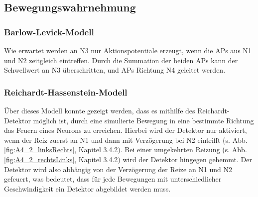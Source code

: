 \documentclass[a4paper]{article}
\begin{document}
\subsection{Bewegungswahrnehmung}
\vspace{1.0\baselineskip}
\subsubsection{Barlow-Levick-Modell} 
Wie erwartet werden an N3 nur Aktionspotentiale erzeugt, wenn die APs aus N1 und N2 zeitgleich eintreffen. Durch die Summation der beiden APs kann der Schwellwert an N3 überschritten, und APs Richtung N4 geleitet werden.
\subsubsection{Reichardt-Hassenstein-Modell}
Über dieses Modell konnte gezeigt werden, dass es mithilfe des Reichardt-Detektor möglich ist, durch eine simulierte Bewegung in eine bestimmte Richtung das Feuern eines Neurons zu erreichen. Hierbei wird der Detektor nur aktiviert, wenn der Reiz zuerst an N1 und dann mit Verzögerung bei N2 eintrifft (s. Abb. \ref{fig:A4_2_linksRechts}, Kapitel 3.4.2). Bei einer umgekehrten Reizung (s. Abb. \ref{fig:A4_2_rechtsLinks}, Kapitel 3.4.2) wird der Detektor hingegen gehemmt. Der Detektor wird also abhängig von der Verzögerung der Reize an N1 und N2 gefeuert, was bedeutet, dass für jede Bewegungen mit unterschiedlicher Geschwindigkeit ein Detektor abgebildet werden muss.

\newpage
\printbibliography
\end{document}
